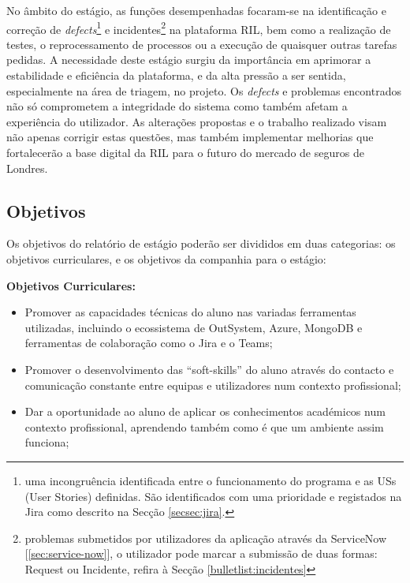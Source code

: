         No âmbito do estágio, as funções desempenhadas focaram-se na identificação e correção de \textit{defects}\footnote{uma incongruência identificada entre o funcionamento do programa e as USs (User Stories) definidas. São identificados com uma prioridade e registados na Jira como descrito na Secção \ref{secsec:jira}.} e incidentes\footnote{problemas submetidos por utilizadores da aplicação através da ServiceNow [\ref{sec:service-now}], o utilizador pode marcar a submissão de duas formas: Request ou Incidente, refira à Secção \ref{bulletlist:incidentes}} na plataforma RIL, bem como a realização de testes, o reprocessamento de processos ou a execução de quaisquer outras tarefas pedidas. A necessidade deste estágio surgiu da importância em aprimorar a estabilidade e eficiência da plataforma, e da alta pressão a ser sentida, especialmente na área de triagem, no projeto. Os \textit{defects} e problemas encontrados não só comprometem a integridade do sistema como também afetam a experiência do utilizador. As alterações propostas e o trabalho realizado visam não apenas corrigir estas questões, mas também implementar melhorias que fortalecerão a base digital da RIL para o futuro do mercado de seguros de Londres.

    
    \subsection{Objetivos}\label{subsec:objetivos}

        Os objetivos do relatório de estágio poderão ser divididos em duas categorias: os objetivos curriculares, e os objetivos da companhia para o estágio:
    
        \textbf{Objetivos Curriculares:}
        \begin{itemize}
          \item Promover as capacidades técnicas do aluno nas variadas ferramentas utilizadas, incluindo o ecossistema de OutSystem, Azure, MongoDB e ferramentas de colaboração como o Jira e o Teams;
          \item Promover o desenvolvimento das ``soft-skills'' do aluno através do contacto e comunicação constante entre equipas e utilizadores num contexto profissional;
          \item Dar a oportunidade ao aluno de aplicar os conhecimentos académicos num contexto profissional, aprendendo também como é que um ambiente assim funciona;
        \end{itemize}
    

